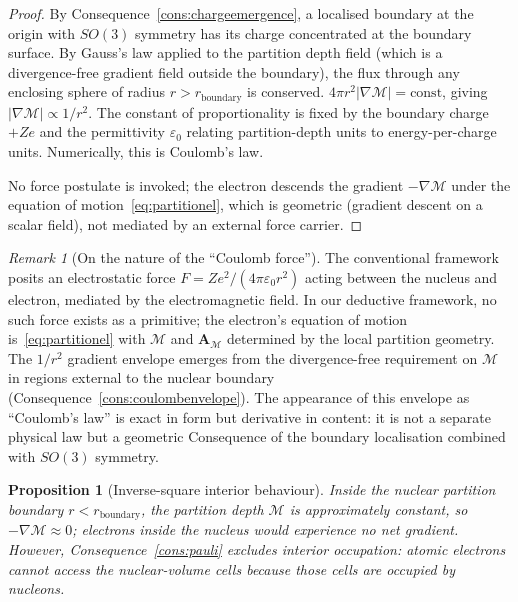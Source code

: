 \documentclass[11pt,twocolumn,a4paper]{article}
\theoremstyle{axiomstyle}
\theoremstyle{conseqstyle}
\newtheorem{proposition}{Proposition}
\theoremstyle{definition}
\theoremstyle{remark}
\newtheorem*{remark}{Remark}
\newcommand{\Depth}{\mathcal{M}}
\newcommand{\Apartition}{\bm{A}_{\Depth}}
\begin{document}
\begin{proof}
By Consequence~\ref{cons:chargeemergence}, a localised boundary at the origin with $SO(3)$ symmetry has its charge concentrated at the boundary surface. By Gauss's law applied to the partition depth field (which is a divergence-free gradient field outside the boundary), the flux through any enclosing sphere of radius $r>r_{\text{boundary}}$ is conserved. $4\pi r^{2}|\nabla\Depth|=\text{const}$, giving $|\nabla\Depth|\propto 1/r^{2}$. The constant of proportionality is fixed by the boundary charge $+Ze$ and the permittivity $\varepsilon_{0}$ relating partition-depth units to energy-per-charge units. Numerically, this is Coulomb's law.

No force postulate is invoked; the electron descends the gradient $-\nabla\Depth$ under the equation of motion~\eqref{eq:partitionel}, which is geometric (gradient descent on a scalar field), not mediated by an external force carrier.
\end{proof}

\begin{remark}[On the nature of the ``Coulomb force'']
The conventional framework posits an electrostatic force $F=Ze^{2}/(4\pi\varepsilon_{0}r^{2})$ acting between the nucleus and electron, mediated by the electromagnetic field. In our deductive framework, no such force exists as a primitive; the electron's equation of motion is~\eqref{eq:partitionel} with $\Depth$ and $\Apartition$ determined by the local partition geometry. The $1/r^{2}$ gradient envelope emerges from the divergence-free requirement on $\Depth$ in regions external to the nuclear boundary (Consequence~\ref{cons:coulombenvelope}). The appearance of this envelope as ``Coulomb's law'' is exact in form but derivative in content: it is not a separate physical law but a geometric Consequence of the boundary localisation combined with $SO(3)$ symmetry.
\end{remark}

\begin{proposition}[Inverse-square interior behaviour]
\label{prop:interiordepth}
Inside the nuclear partition boundary $r<r_{\text{boundary}}$, the partition depth $\Depth$ is approximately constant, so $-\nabla\Depth\approx 0$; electrons inside the nucleus would experience no net gradient. However, Consequence~\ref{cons:pauli} excludes interior occupation: atomic electrons cannot access the nuclear-volume cells because those cells are occupied by nucleons.
\end{proposition}
\end{document}
